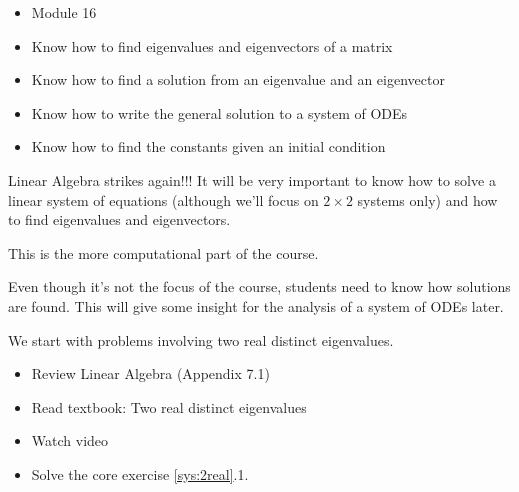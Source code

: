\begin{lesson}

	\begin{itemize}
		\item Module 16
	\end{itemize}

	\begin{itemize}
		\item Know how to find eigenvalues and eigenvectors of a matrix
		\item Know how to find a solution from an eigenvalue and an eigenvector
		\item Know how to write the general solution to a system of ODEs
		\item Know how to find the constants given an initial condition
	\end{itemize}
	

Linear Algebra strikes again!!! It will be very important to know how to solve a linear system of equations (although we'll focus on $2\times 2$ systems only) and how to find eigenvalues and eigenvectors. 

This is the more computational part of the course. 

Even though it's not the focus of the course, students need to know how solutions are found. This will give some insight for the analysis of a system of ODEs later. 

We start with problems involving two real distinct eigenvalues.

\begin{itemize}
	\item Review Linear Algebra (Appendix 7.1)
	\item Read textbook: Two real distinct eigenvalues
	\item Watch video
	\item Solve the core exercise \ref{sys:2real}.1.
\end{itemize}

\end{lesson}




